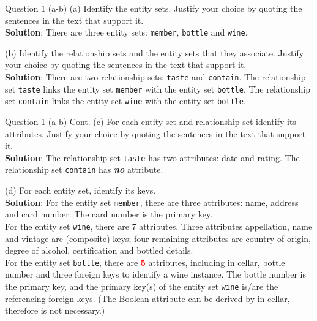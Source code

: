 \begin{frame}[fragile]{Question 1 (a-b)}
(a) Identify the entity sets. Justify your choice by quoting the sentences in the text that support it.\\ \vspace{5pt}
\textbf{Solution}: There are three entity sets: \texttt{member}, \texttt{bottle} and \texttt{wine}.\\ \vspace{10pt}

(b) Identify the relationship sets and the entity sets that they associate. Justify your choice by quoting the sentences in the text that support it.\\ \vspace{5pt}
\textbf{Solution}: There are two relationship sets: \texttt{taste} and \texttt{contain}. The relationship set \texttt{taste} links the entity set \texttt{member} with the entity set \texttt{bottle}. The relationship set \texttt{contain} links the entity set \texttt{wine} with the entity set \texttt{bottle}.
\end{frame}

\begin{frame}[fragile]{Question 1 (a-b) Cont.}
(c) For each entity set and relationship set identify its attributes. Justify your choice by quoting the sentences in the text that support it.\\ \vspace{5pt}
\textbf{Solution}: The relationship set \texttt{taste} has two attributes: date and rating. The relationship set \texttt{contain} has \textbf{\textit{no}} attribute. \\ \vspace{10pt}
	
(d) For each entity set, identify its keys.\\ \vspace{5pt}
\textbf{Solution}: For the entity set \texttt{member}, there are three attributes: name, address and card number. The card number is the primary key.\\\vspace{3pt}
For the entity set \texttt{wine}, there are 7 attributes. Three attributes appellation, name and vintage are (composite) keys; four remaining attributes are country of origin, degree of alcohol, certification and bottled details.\\\vspace{3pt}
For the entity set \texttt{bottle}, there are \textcolor{red}{\textbf{5}} attributes, including in cellar, bottle number and three foreign keys to identify a wine instance. The bottle number is the primary key, and the primary key(s) of the entity set \texttt{wine} is/are the referencing foreign keys. (The Boolean attribute can be derived by in cellar, therefore is not necessary.)
\end{frame}

